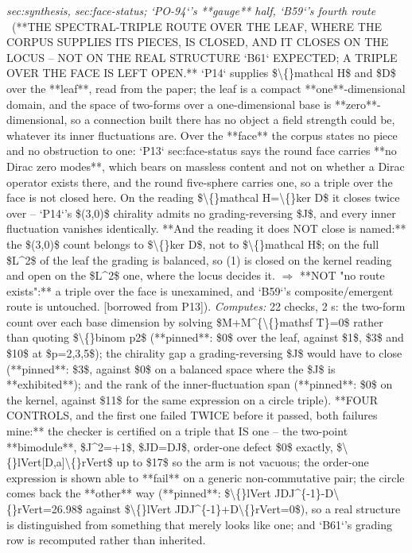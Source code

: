 \begin{description}
\textit{sec:synthesis, sec:face-status; `PO-94`'s **gauge** half, `B59`'s fourth route} \ (**THE SPECTRAL-TRIPLE ROUTE OVER THE LEAF, WHERE THE CORPUS SUPPLIES ITS PIECES, IS CLOSED, AND IT CLOSES ON THE LOCUS -- NOT ON THE REAL STRUCTURE `B61` EXPECTED; A TRIPLE OVER THE FACE IS LEFT OPEN.** `P14` supplies \$\textbackslash\{\}mathcal H\$ and \$D\$ over the **leaf**, read from the paper; the leaf is a compact **one**-dimensional domain, and the space of two-forms over a one-dimensional base is **zero**-dimensional, so a connection built there has no object a field strength could be, whatever its inner fluctuations are. Over the **face** the corpus states no piece and no obstruction to one: `P13` sec:face-status says the round face carries **no Dirac zero modes**, which bears on massless content and not on whether a Dirac operator exists there, and the round five-sphere carries one, so a triple over the face is not closed here. On the reading \$\textbackslash\{\}mathcal H=\textbackslash\{\}ker D\$ it closes twice over -- `P14`'s \$(3,0)\$ chirality admits no grading-reversing \$J\$, and every inner fluctuation vanishes identically.  **And the reading it does NOT close is named:** the \$(3,0)\$ count belongs to \$\textbackslash\{\}ker D\$, not to \$\textbackslash\{\}mathcal H\$; on the full \$L\textasciicircum{}2\$ of the leaf the grading is balanced, so (1) is closed on the kernel reading and open on the \$L\textasciicircum{}2\$ one, where the locus decides it. \ensuremath{\Rightarrow} **NOT "no route exists":** a triple over the face is unexamined, and `B59`'s composite/emergent route is untouched. [borrowed from P13]). 
\emph{Computes:} 22 checks, 2 s: the two-form count over each base dimension by solving \$M+M\textasciicircum{}\{\textbackslash\{\}mathsf T\}=0\$ rather than quoting \$\textbackslash\{\}binom p2\$ (**pinned**: \$0\$ over the leaf, against \$1\$, \$3\$ and \$10\$ at \$p=2,3,5\$); the chirality gap a grading-reversing \$J\$ would have to close (**pinned**: \$3\$, against \$0\$ on a balanced space where the \$J\$ is **exhibited**); and the rank of the inner-fluctuation span (**pinned**: \$0\$ on the kernel, against \$11\$ for the same expression on a circle triple). **FOUR CONTROLS, and the first one failed TWICE before it passed, both failures mine:** the checker is certified on a triple that IS one -- the two-point **bimodule**, \$J\textasciicircum{}2=+1\$, \$JD=DJ\$, order-one defect \$0\$ exactly, \$\textbackslash\{\}lVert[D,a]\textbackslash\{\}rVert\$ up to \$17\$ so the arm is not vacuous; the order-one expression is shown able to **fail** on a generic non-commutative pair; the circle comes back the **other** way (**pinned**: \$\textbackslash\{\}lVert JDJ\textasciicircum{}\{-1\}-D\textbackslash\{\}rVert=26.98\$ against \$\textbackslash\{\}lVert JDJ\textasciicircum{}\{-1\}+D\textbackslash\{\}rVert=0\$), so a real structure is distinguished from something that merely looks like one; and `B61`'s grading row is recomputed rather than inherited.

\end{description}
